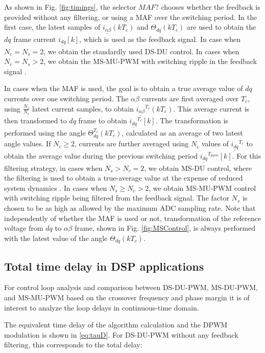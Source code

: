 \documentclass[conference]{IEEEtran}
\begin{document}
As shown in Fig. \ref{fig:timings}, the selector $MAF?$ chooses whether the feedback is provided without any filtering, or using a MAF over the switching period. In the first case, the latest samples of $\underline{i_{\alpha \beta}}(kT_c)$ and $\Theta_{dq}(kT_c)$ are used to obtain the $dq$ frame current $\underline{i_{dq}}[k]$, which is used as the feedback signal. In case when $N_c = N_s = 2$, we obtain the standardly used DS-DU control. In cases when $N_c = N_s > 2$, we obtain the MS-MU-PWM with switching ripple in the feedback signal \cite{Petric2020}.

In cases when the MAF is used, the goal is to obtain a true average value of $dq$ currents over one switching period. The $\alpha \beta$ currents are first averaged over $T_c$, using $\frac{N_s}{N_c}$ latest current samples, to obtain $\underline{i_{\alpha \beta}}^{T_c} (kT_c)$. This average current is then transformed to $dq$ frame to obtain $\underline{i_{dq}}^{T_c} [k]$. The transformation is performed using the angle $\Theta_{dq}^{T_c}(kT_c)$, calculated as an average of two latest angle values. If $N_c\geq 2$, currents are further averaged using $N_c$ values of $\underline{i_{dq}}^{T_c}$ to obtain the average value during the previous switching period $\underline{i_{dq}}^{T_{pwm}}[k]$.
For this filtering strategy, in cases when $N_s>N_c = 2$, we obtain MS-DU control, where the filtering is used to obtain a true-average value at the expense of reduced system dynamics \cite{vuksa2016}. In cases when $N_s \geq N_c > 2$, we obtain MS-MU-PWM control with switching ripple being filtered from the feedback signal. The factor $N_s$ is chosen to be as high as allowed by the maximum ADC sampling rate.
Note that independently of whether the MAF is used or not, transformation of the reference voltage from $dq$ to $\alpha \beta$ frame, shown in Fig. \ref{fig:MSControl}, is always performed with the latest value of the angle $\Theta_{dq}(kT_c)$.

\subsection{Total time delay in DSP applications}

For control loop analysis and comparison between DS-DU-PWM, MS-DU-PWM, and MS-MU-PWM based on the crossover frequency and phase margin it is of interest to analyze the loop delays in continuous-time domain.

The equivalent time delay of the algorithm calculation and the DPWM modulation is shown in \eqref{eq:tauD}. For DS-DU-PWM without any feedback filtering, this corresponds to the total delay:
\end{document}

